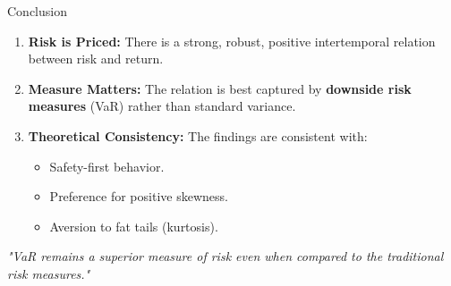 \documentclass{beamer}
\begin{document}
\begin{frame}{Conclusion}
    \begin{enumerate}
        \item \textbf{Risk is Priced:} There is a strong, robust, positive intertemporal relation between risk and return.
        \item \textbf{Measure Matters:} The relation is best captured by \textbf{downside risk measures} (VaR) rather than standard variance.
        \item \textbf{Theoretical Consistency:} The findings are consistent with:
            \begin{itemize}
                \item Safety-first behavior.
                \item Preference for positive skewness.
                \item Aversion to fat tails (kurtosis).
            \end{itemize}
    \end{enumerate}

    \vspace{0.5cm}
    \centering
    \textit{"VaR remains a superior measure of risk even when compared to the traditional risk measures."}
\end{frame}
\end{document}
